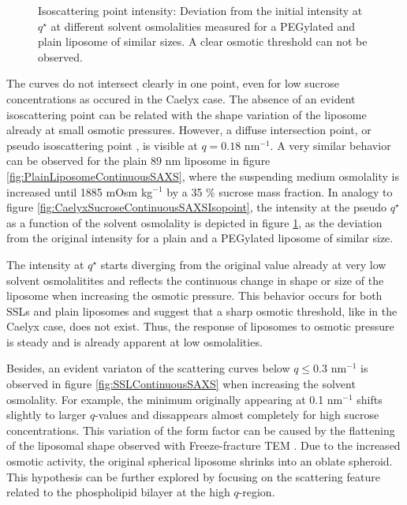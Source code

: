 \begin{figure}
	\centering
		
		\caption[Isoscattering point intensity of liposomes.]{Isoscattering point intensity: Deviation from the initial intensity at $q^{\star}$ at different solvent osmolalities measured for a PEGylated and plain liposome of similar sizes. A clear osmotic threshold can not be observed.}
		\label{fig:SSLIsopointIntensity}
\end{figure}

The curves do not intersect clearly in one point, even for low sucrose concentrations as occured in the Caelyx \textregistered case. The absence of an evident isoscattering point can be related with the shape variation of the liposome already at small osmotic pressures. However, a diffuse intersection point, or pseudo isoscattering point \citep{kawaguchi_application_2004}, is visible at $q=0.18$ nm$^{-1}$. A very similar behavior can be observed for the plain 89 nm liposome in figure \ref{fig:PlainLiposomeContinuousSAXS}, where the suspending medium osmolality is increased until 1885 mOsm kg$^{-1}$ by a 35 $\%$ sucrose mass fraction. In analogy to figure \ref{fig:CaelyxSucroseContinuousSAXSIsopoint}, the intensity at the pseudo $q^{\star}$ as a function of the solvent osmolality is depicted in figure \ref{fig:SSLIsopointIntensity}, as the deviation from the original intensity for a plain and a PEGylated liposome of similar size.

The intensity at $q^{\star}$ starts diverging from the original value already at very low solvent osmolalitites and reflects the continuous change in shape or size of the liposome when increasing the osmotic pressure. This behavior occurs for both SSLs and plain liposomes and suggest that a sharp osmotic threshold, like in the Caelyx case, does not exist. Thus, the response of liposomes to osmotic pressure is steady and is already apparent at low osmolalities.

Besides, an evident variaton of the scattering curves below $q\leq0.3$ nm$^{-1}$ is observed in figure \ref{fig:SSLContinuousSAXS} when increasing the solvent osmolality. For example, the minimum originally appearing at 0.1 nm$^{-1}$ shifts slightly to larger $q$-values and dissappears almost completely for high sucrose concentrations. This variation of the form factor can be caused by the flattening of the liposomal shape observed with Freeze-fracture TEM \citep{varga_osmotic_2014}. Due to the increased osmotic activity, the original spherical liposome shrinks into an oblate spheroid. This hypothesis can be further explored by focusing on the scattering feature related to the phospholipid bilayer at the high $q$-region.

